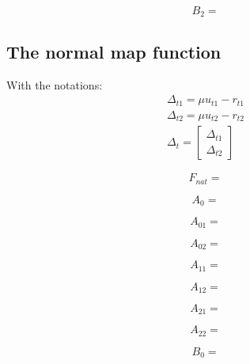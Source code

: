 \documentclass[a4paper]{article}
\begin{document}
\begin{equation}
  B_2 = 
\end{equation}

\subsection{The normal map function}

With the notations:
\begin{equation}
  \begin{array}{c}
    \Delta_{t1} = \mu u_{t1}-r_{t1}\\
    \Delta_{t2} = \mu u_{t2}-r_{t2}\\
    \Delta_{t} = \left [
      \begin{array}{c}
        \Delta_{t1}\\
        \Delta_{t2}
      \end{array} \right]
  \end{array}
\end{equation}

\begin{equation}
  F_{nat} = 
\end{equation}

\begin{equation}
  A_0 = 
\end{equation}

\begin{equation}
  A_{01} = 
\end{equation}

\begin{equation}
  A_{02} = 
\end{equation}

\begin{equation}
  A_{11} = 
\end{equation}

\begin{equation}
  A_{12} = 
\end{equation}

\begin{equation}
  A_{21} = 
\end{equation}

\begin{equation}
  A_{22} = 
\end{equation}

\begin{equation}
  B_0 = 
\end{equation}
\end{document}
